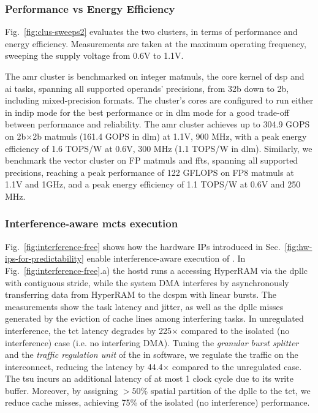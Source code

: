 \subsubsection{Performance vs Energy Efficiency}
\label{sec:perf-vs-ee}
Fig.~\ref{fig:clus-sweeps2} evaluates the two clusters, in terms of performance and energy efficiency. Measurements are taken at the maximum operating frequency, sweeping the supply voltage from 0.6V to 1.1V. 

The \gls{amr} cluster is benchmarked on integer \glspl{matmul}, the core kernel of \gls{dsp} and \gls{ai} tasks, spanning all supported operands' precisions, from 32b down to 2b, including mixed-precision formats. The cluster's cores are configured to run either in \gls{indip} mode for the best performance or in \gls{dlm} mode for a good trade-off between performance and reliability. The \gls{amr} cluster achieves up to 304.9 GOPS on 2b$\times$2b \glspl{matmul} (161.4 GOPS in \gls{dlm}) at 1.1V, 900 MHz, with a peak energy efficiency of 1.6 TOPS/W at 0.6V, 300 MHz (1.1 TOPS/W in \gls{dlm}).
%
Similarly, we benchmark the vector cluster on FP \glspl{matmul} and \gls{ffts}, spanning all supported precisions, reaching a peak performance of 122 GFLOPS on FP8 \glspl{matmul} at 1.1V and 1GHz, and a peak energy efficiency of 1.1 TOPS/W at 0.6V and 250 MHz.


\subsubsection{Interference-aware \glspl{mct} execution}
\label{sec:interference-free}
Fig.~\ref{fig:interference-free} shows how the hardware IPs introduced in Sec.~\ref{fig:hw-ips-for-predictability} enable interference-aware execution of . 
%
In Fig.~\ref{fig:interference-free}.a) the \gls{hostd} runs a  accessing HyperRAM via the \gls{dpllc} with contiguous stride, while the system DMA interferes by asynchronously transferring data from HyperRAM to the \gls{dcspm} with linear bursts. The measurements show the task latency and jitter, as well as the \gls{dpllc} misses generated by the eviction of cache lines among interfering tasks. In unregulated interference, the \gls{tct} latency degrades by 225$\times$ compared to the isolated (no interference) case (i.e. no interfering DMA). Tuning the \textit{granular burst splitter} and the \textit{traffic regulation unit} of the  in software, we regulate the traffic on the interconnect, reducing the latency by 44.4$\times$ compared to the unregulated case. The \gls{tsu} incurs an additional latency of at most 1 clock cycle due to its write buffer. Moreover, by assigning $> 50\%$ spatial partition of the \gls{dpllc} to the \gls{tct}, we reduce cache misses, achieving 75\% of the isolated (no interference) performance.

